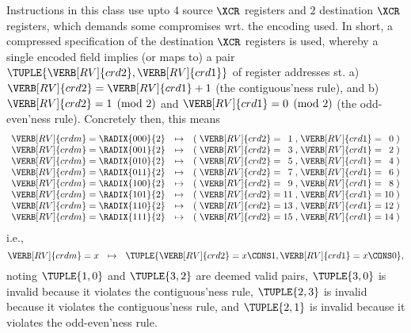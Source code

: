 Instructions in this class use upto
$4$ source      $\XCR$ registers
and
$2$ destination $\XCR$ registers,
which demands some compromises wrt. the encoding used.
In short, a compressed specification of the destination $\XCR$ registers is
used, whereby a single encoded  field implies (or maps to) a 
pair 
$
\TUPLE{ \VERB[RV]{crd2}, \VERB[RV]{crd1} }
$
of register addresses st.
a) $\VERB[RV]{crd2} = \VERB[RV]{crd1} + 1$
   (the contiguous'ness rule),
   and
b) $\VERB[RV]{crd2} = 1 \pmod{2}$
   and 
   $\VERB[RV]{crd1} = 0 \pmod{2}$
   (the  odd-even'ness rule).
Concretely then, this means
\[
\begin{array}{l@{\;}c@{\;}r c c@{\;}l@{\;}c@{\;}r@{\;}c@{\;}l@{\;}c@{\;}r@{\;}c}
\VERB[RV]{crdm} &=& \RADIX{000}{2} &\mapsto& ( & \VERB[RV]{crd2} &=&  1 &,& \VERB[RV]{crd1} &=&  0 & ) \\
\VERB[RV]{crdm} &=& \RADIX{001}{2} &\mapsto& ( & \VERB[RV]{crd2} &=&  3 &,& \VERB[RV]{crd1} &=&  2 & ) \\
\VERB[RV]{crdm} &=& \RADIX{010}{2} &\mapsto& ( & \VERB[RV]{crd2} &=&  5 &,& \VERB[RV]{crd1} &=&  4 & ) \\
\VERB[RV]{crdm} &=& \RADIX{011}{2} &\mapsto& ( & \VERB[RV]{crd2} &=&  7 &,& \VERB[RV]{crd1} &=&  6 & ) \\
\VERB[RV]{crdm} &=& \RADIX{100}{2} &\mapsto& ( & \VERB[RV]{crd2} &=&  9 &,& \VERB[RV]{crd1} &=&  8 & ) \\
\VERB[RV]{crdm} &=& \RADIX{101}{2} &\mapsto& ( & \VERB[RV]{crd2} &=& 11 &,& \VERB[RV]{crd1} &=& 10 & ) \\
\VERB[RV]{crdm} &=& \RADIX{110}{2} &\mapsto& ( & \VERB[RV]{crd2} &=& 13 &,& \VERB[RV]{crd1} &=& 12 & ) \\
\VERB[RV]{crdm} &=& \RADIX{111}{2} &\mapsto& ( & \VERB[RV]{crd2} &=& 15 &,& \VERB[RV]{crd1} &=& 14 & ) \\
\end{array}
\]
i.e.,
\[
\VERB[RV]{crdm} = x ~~\mapsto~~ \TUPLE{ \VERB[RV]{crd2} = x \CONS 1 , \VERB[RV]{crd1} = x \CONS 0 } ,
\]
noting
$\TUPLE{ 1, 0 }$ and $\TUPLE{ 3, 2 }$ are deemed valid pairs,
$\TUPLE{ 3, 0 }$ is invalid because it violates the contiguous'ness rule,
$\TUPLE{ 2, 3 }$ is invalid because it violates the contiguous'ness rule,
and
$\TUPLE{ 2, 1 }$ is invalid because it violates the  odd-even'ness rule.



